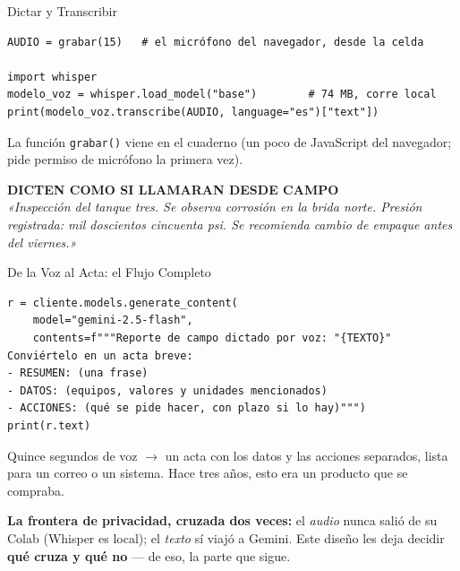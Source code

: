 \documentclass[aspectratio=169, 11pt]{beamer}
\begin{document}
\begin{frame}[fragile, shrink=5]{Dictar y Transcribir}
  \vspace{-2pt}
  \begin{verbatim}
AUDIO = grabar(15)   # el micrófono del navegador, desde la celda

import whisper
modelo_voz = whisper.load_model("base")        # 74 MB, corre local
print(modelo_voz.transcribe(AUDIO, language="es")["text"])
  \end{verbatim}
  \vspace{2pt}
  {\scriptsize\color{textMuted}
   La función \texttt{grabar()} viene en el cuaderno (un poco de JavaScript
   del navegador; pide permiso de micrófono la primera vez).}
  \vspace{3pt}
  \begin{tcolorbox}[colback=arcaGray, colframe=arcaDark, boxrule=0pt,
    leftrule=3pt, arc=3pt, left=8pt, right=8pt, top=4pt, bottom=4pt]
    {\scriptsize\color{arcaDark}\bfseries DICTEN COMO SI LLAMARAN DESDE CAMPO}\\[2pt]
    {\scriptsize\color{textMuted}\itshape
     «Inspección del tanque tres. Se observa corrosión en la brida norte.
     Presión registrada: mil doscientos cincuenta psi. Se recomienda cambio
     de empaque antes del viernes.»}
  \end{tcolorbox}
\end{frame}

\begin{frame}[fragile, shrink=5]{De la Voz al Acta: el Flujo Completo}
  \vspace{-2pt}
  \begin{verbatim}
r = cliente.models.generate_content(
    model="gemini-2.5-flash",
    contents=f"""Reporte de campo dictado por voz: "{TEXTO}"
Conviértelo en un acta breve:
- RESUMEN: (una frase)
- DATOS: (equipos, valores y unidades mencionados)
- ACCIONES: (qué se pide hacer, con plazo si lo hay)""")
print(r.text)
  \end{verbatim}
  \vspace{2pt}
  {\footnotesize\color{textMuted}
   Quince segundos de voz $\to$ un acta con los datos y las acciones
   separados, lista para un correo o un sistema. Hace tres años, esto era
   un producto que se compraba.}
  \vspace{2pt}
  \begin{tcolorbox}[colback=arcaGray, colframe=arcaRed, boxrule=0pt,
    leftrule=3pt, arc=3pt, left=8pt, right=8pt, top=3pt, bottom=3pt]
    {\scriptsize\color{textMuted}
     \textbf{\color{arcaRed}La frontera de privacidad, cruzada dos veces:}
     el \emph{audio} nunca salió de su Colab (Whisper es local); el
     \emph{texto} sí viajó a Gemini. Este diseño les deja decidir
     \textbf{qué cruza y qué no} --- de eso, la parte que sigue.}
  \end{tcolorbox}
\end{frame}
\end{document}
